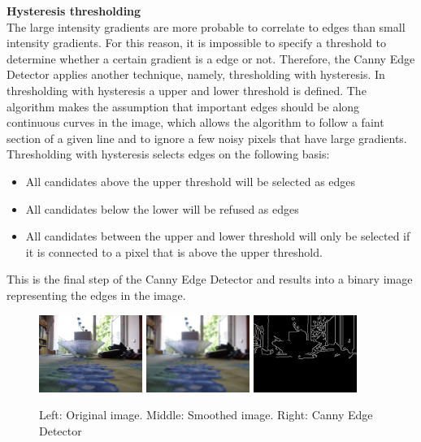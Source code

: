 \documentclass[a4paper]{article}
\begin{document}
\noindent\textbf{Hysteresis thresholding}\\
The large intensity gradients are more probable to correlate to edges than small intensity gradients. For this reason, it is impossible to specify a threshold to determine whether a certain gradient is a edge or not. Therefore, the Canny Edge Detector applies another technique, namely, thresholding with hysteresis. In thresholding with hysteresis a upper and lower threshold is defined. The algorithm makes the assumption that important edges should be along continuous curves in the image, which allows the algorithm to follow a faint section of a given line and to ignore a few noisy pixels that have large gradients. Thresholding with hysteresis selects edges on the following basis:
\begin{itemize}
\item All candidates above the upper threshold will be selected as edges
\item All candidates below the lower will be refused as edges
\item All candidates between the upper and lower threshold will only be selected if it is connected to a pixel that is above the upper threshold.
\end{itemize}
This is the final step of the Canny Edge Detector and results into a binary image representing the edges in the image.

\begin{figure}[!ht]
\centering
\includegraphics[width=0.3\textwidth]{images/frame0.jpg}
\includegraphics[width=0.3\textwidth]{images/gaussian_blur_3.png} \includegraphics[width=0.3\textwidth]{images/canny.png}

\caption{Left: Original image. Middle: Smoothed image. Right: Canny Edge Detector}
\label{canny}
\end{figure}
\end{document}
